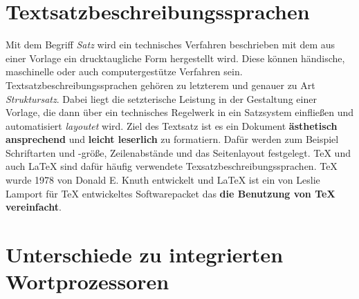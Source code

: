 \section{Textsatzbeschreibungssprachen}
Mit dem Begriff \textit{Satz} wird ein technisches Verfahren beschrieben mit dem aus einer Vorlage ein drucktaugliche Form hergestellt wird. Diese können händische, maschinelle oder auch computergestütze Verfahren sein. Textsatzbeschreibungssprachen gehören zu letzterem und genauer zu Art \textit{Struktursatz}. Dabei liegt die setzterische Leistung in der Gestaltung einer Vorlage, die dann über ein technisches Regelwerk in ein Satzsystem einfließen und automatisiert \textit{layoutet} wird. Ziel des Textsatz ist es ein Dokument \textbf{ästhetisch ansprechend} und \textbf{leicht leserlich} zu formatiern. Dafür werden zum Beispiel Schriftarten und -größe, Zeilenabstände und das Seitenlayout festgelegt\nocite{satzwiki:2023}.
TeX und auch LaTeX sind dafür häufig verwendete Texsatzbeschreibungssprachen. TeX wurde 1978 von Donald E. Knuth entwickelt und LaTeX ist ein von Leslie Lamport für TeX entwickeltes Softwarepacket das \textbf{die Benutzung von TeX vereinfacht}. 

\section{Unterschiede zu integrierten Wortprozessoren}

